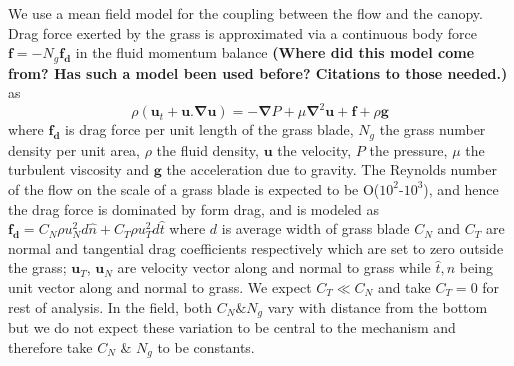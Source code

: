 \documentclass[aps,prl,twocolumn,showpacs,superscriptaddress,groupedaddress,10pt]{revtex4-1}  %
\newcommand{\bu}{\mathbf{u}}
\newcommand{\grad}{\mathbf{\nabla}}
\newcommand{\shreyas}[1]{{\bf (#1)}}
\begin{document}
We use a mean field model for the coupling between the flow and the canopy. Drag force exerted by the grass is approximated via a 
continuous body force $\mathbf{f}=-N_g\mathbf{f_d}$ in the fluid momentum balance\cite{Vivoni98,Nepf99,Ghisal02,Delangre04,Delangre06} 
\shreyas{Where did this model come from? Has such a model been used before? Citations to those needed.} as
\begin{equation}
\rho \left(\bu_{t}+\bu.\grad\bu \right) = -\grad P+\mu\grad^{2}\bu +\mathbf{f}+\rho\mathbf{g}
\label{navier-stokes}
\end{equation}
where $\mathbf{f_{d}}$ is drag force per unit length of the grass blade, $N_g$ the grass number density per unit area, $\rho$ the fluid density, $\mathbf{u}$ the velocity, 
$P$ the pressure, $\mu$ the turbulent viscosity and $\mathbf{g}$ the acceleration due to gravity. The Reynolds number of the flow on the scale of a grass blade is expected to 
be O($10^2$-$10^3$), and hence the drag force is dominated by form drag, and is modeled 
as $\mathbf{f_{d}}=C_N \rho u_{N}^{2}d\hat{n}+C_{T}\rho u_{T}^{2}d\hat{t}$ where $d$ is average width of grass blade
$C_{N}$ and $C_{T}$ are normal and tangential drag coefficients respectively which are set to zero outside the grass; $\bu_{T}$, $\bu_{N}$ are velocity vector along and
normal to grass while $\hat{t},\hat{n}$ being unit vector along and normal to grass. We expect $C_T \ll C_N$ and take $C_T=0$ for rest of analysis. In the field, both $C_N \& N_g$ 
vary with distance from the bottom but we do not expect these variation to be central to the mechanism and therefore take $C_N$ \& $N_g$ to be constants.
\end{document}

